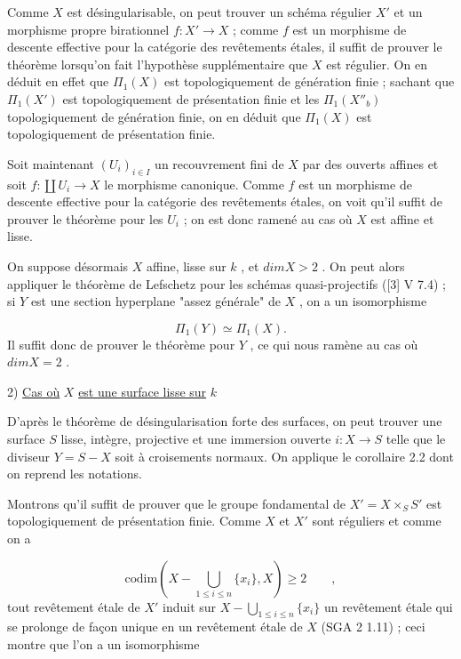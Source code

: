 Comme $X$ est désingularisable, on peut trouver un schéma régulier $X'$ et un morphisme propre birationnel $f : X' \longrightarrow X$ ; comme $f$ est un morphisme de descente effective pour la catégorie des revêtements étales, il suffit de prouver le théorème lorsqu'on fait l'hypothèse supplémentaire que $X$ est régulier. On en déduit en effet que $\Pi_1(X)$ est topologiquement de génération finie ; sachant que $\Pi_1(X')$ est topologiquement de présentation finie et les $\Pi_1(X''_b)$ topologiquement de génération finie, on en déduit que $\Pi_1(X)$ est topologiquement de présentation finie.

Soit maintenant $(U_i)_{i \in I}$ un recouvrement fini de $X$ par des ouverts affines et soit $f : \coprod U_i \longrightarrow X$ le morphisme canonique. Comme $f$ est un morphisme de descente effective pour la catégorie des revêtements étales, on voit qu'il suffit de prouver le théorème pour les $U_i$ ; on est donc ramené au cas où $X$ est affine et lisse.

On suppose désormais $X$ affine, lisse sur $k$ , et $dim X > 2$ . On peut alors appliquer le théorème de Lefschetz pour les schémas quasi-projectifs ([3] V 7.4) ; si $Y$ est une section hyperplane "assez générale" de $X$ , on a un isomorphisme

\begin{equation*}
\Pi_1(Y) \simeq \Pi_1(X) .
\end{equation*}
Il suffit donc de prouver le théorème pour $Y$ , ce qui nous ramène au cas où $dim X = 2$ .


2) \underline{Cas où} $X$ \underline{est une surface lisse sur} $k$

D'après le théorème de désingularisation forte des surfaces, on peut trouver une surface $S$ lisse, intègre, projective et une immersion ouverte $i : X \longrightarrow S$ telle que le diviseur $Y = S - X$ soit à croisements normaux. On applique le corollaire 2.2 dont on reprend les notations.


Montrons qu'il suffit de prouver que le groupe fondamental de $X' = X\times_S S'$ est topologiquement de présentation finie. Comme $X$ et $X'$ sont réguliers et comme on a

\begin{equation*}
\mathrm{codim}(X- \bigcup_{1\leqslant i\leqslant n} \{x_i\},X) \geqslant 2 \qquad ,
\end{equation*}
tout revêtement étale de $X'$ induit sur $X- \bigcup_{1\leqslant i\leqslant n}\{x_i\}$ un revêtement étale qui se prolonge de façon unique en un revêtement étale de $X$ (SGA 2 1.11) ; ceci montre que l'on a un isomorphisme


